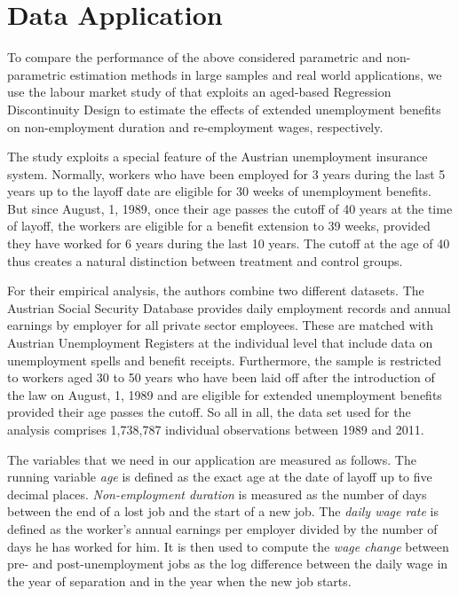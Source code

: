 \documentclass[11pt, a4paper, leqno]{article}
\numberwithin{equation}{section}
\numberwithin{figure}{section}
\numberwithin{table}{section}
\numberwithin{algorithm}{section}
\begin{document}
\section{Data Application} %
\label{sec: data_application}

To compare the performance of the above considered parametric and non-parametric estimation methods in large samples and real world applications, we use the labour market study of \cite{nekoei_weber} that exploits an aged-based Regression Discontinuity Design to estimate the effects of extended unemployment benefits on non-employment duration and re-employment wages, respectively.

The study exploits a special feature of the Austrian unemployment insurance system. Normally, workers who have been employed for 3 years during the last 5 years up to the layoff date are eligible for 30 weeks of unemployment benefits. But since August, 1, 1989, once their age passes the cutoff of 40 years at the time of layoff, the workers are eligible for a benefit extension to 39 weeks, provided they have worked for 6 years during the last 10 years. The cutoff at the age of 40 thus creates a natural distinction between treatment and control groups.

For their empirical analysis, the authors combine two different datasets. The Austrian Social Security Database provides daily employment records and annual earnings by employer for all private sector employees. These are matched with Austrian Unemployment Registers at the individual level that include data on unemployment spells and benefit receipts. Furthermore, the sample is restricted to workers aged 30 to 50 years who have been laid off after the introduction of the law on August, 1, 1989 and are eligible for extended unemployment benefits provided their age passes the cutoff. So all in all, the data set used for the analysis comprises 1,738,787 individual observations between 1989 and 2011.

The variables that we need in our application are measured as follows. The running variable \textit{age} is defined as the exact age at the date of layoff up to five decimal places. \textit{Non-employment duration} is measured as the number of days between the end of a lost job and the start of a new job. The \textit{daily wage rate} is defined as the worker's annual earnings per employer divided by the number of days he has worked for him. It is then used to compute the \textit{wage change} between pre- and post-unemployment jobs as the log difference between the daily wage in the year of separation and in the year when the new job starts.
\end{document}
